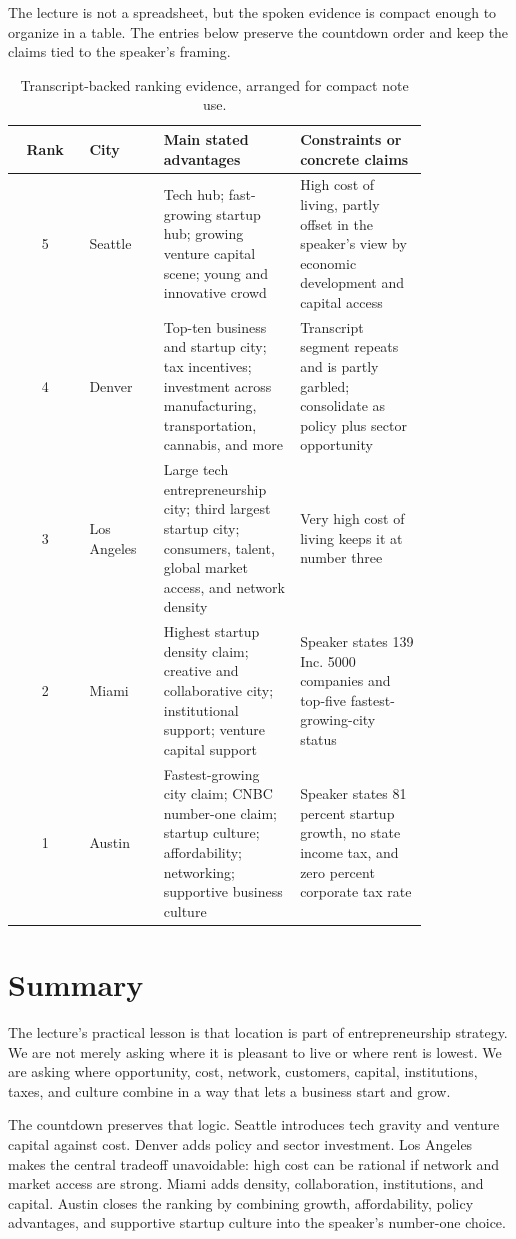 The lecture is not a spreadsheet, but the spoken evidence is compact enough to organize in a table. The entries below preserve the countdown order and keep the claims tied to the speaker's framing.

\begin{table}
\centering
\begin{tabular}{c|p{0.18\linewidth}|p{0.33\linewidth}|p{0.31\linewidth}}
Rank & City & Main stated advantages & Constraints or concrete claims \\
\hline
5 & Seattle &
Tech hub; fast-growing startup hub; growing venture capital scene; young and innovative crowd &
High cost of living, partly offset in the speaker's view by economic development and capital access \\
\hline
4 & Denver &
Top-ten business and startup city; tax incentives; investment across manufacturing, transportation, cannabis, and more &
Transcript segment repeats and is partly garbled; consolidate as policy plus sector opportunity \\
\hline
3 & Los Angeles &
Large tech entrepreneurship city; third largest startup city; consumers, talent, global market access, and network density &
Very high cost of living keeps it at number three \\
\hline
2 & Miami &
Highest startup density claim; creative and collaborative city; institutional support; venture capital support &
Speaker states 139 Inc. 5000 companies and top-five fastest-growing-city status \\
\hline
1 & Austin &
Fastest-growing city claim; CNBC number-one claim; startup culture; affordability; networking; supportive business culture &
Speaker states 81 percent startup growth, no state income tax, and zero percent corporate tax rate \\
\end{tabular}
\caption{Transcript-backed ranking evidence, arranged for compact note use.}
\end{table}

\section{Summary}

The lecture's practical lesson is that location is part of entrepreneurship strategy. We are not merely asking where it is pleasant to live or where rent is lowest. We are asking where opportunity, cost, network, customers, capital, institutions, taxes, and culture combine in a way that lets a business start and grow.

The countdown preserves that logic. Seattle introduces tech gravity and venture capital against cost. Denver adds policy and sector investment. Los Angeles makes the central tradeoff unavoidable: high cost can be rational if network and market access are strong. Miami adds density, collaboration, institutions, and capital. Austin closes the ranking by combining growth, affordability, policy advantages, and supportive startup culture into the speaker's number-one choice.